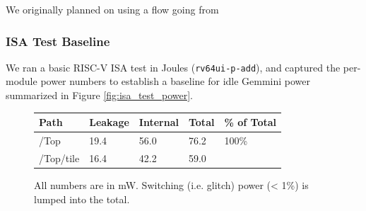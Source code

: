 \documentclass[sigconf]{acmart}
\begin{document}
We originally planned on using a flow going from 

\subsubsection{ISA Test Baseline}
We ran a basic RISC-V ISA test in Joules (\texttt{rv64ui-p-add}), and captured the per-module power numbers to establish a baseline for idle Gemmini power summarized in Figure \ref{fig:isa_test_power}.

\begin{figure}
  \begin{tabular}{l l l l l}
    \textbf{Path} & \textbf{Leakage} & \textbf{Internal} & \textbf{Total} & \textbf{\% of Total} \\ \toprule
    /Top & 19.4 & 56.0 & 76.2 & 100\% \\ \midrule
    /Top/tile & 16.4 & 42.2 & 59.0 &  \\ \midrule
    \bottomrule
  \end{tabular}
  \caption{All numbers are in mW. Switching (i.e. glitch) power (< 1\%) is lumped into the total.}
\end{figure}

\end{document}
